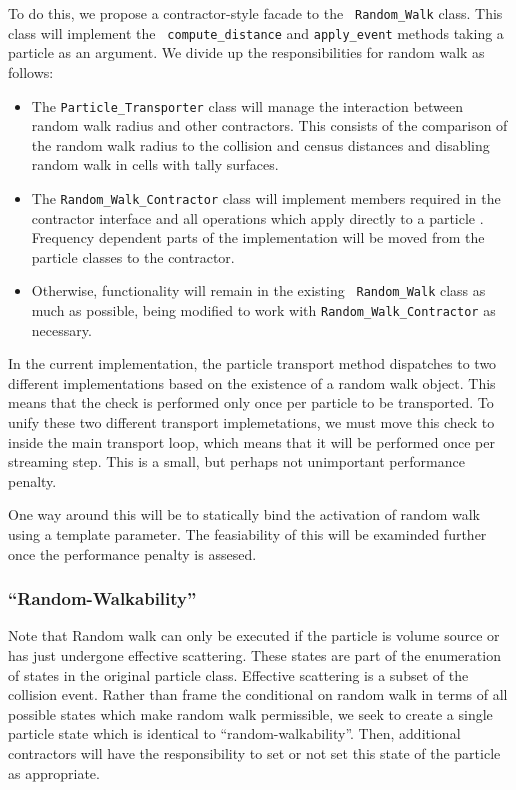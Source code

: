 \documentclass[memo]{ResearchNote}
\begin{document}
To do this, we propose a contractor-style facade to the {\tt
  Random\_Walk} class. This class will implement the {\tt
  compute\_distance} and {\tt apply\_event} methods taking a particle as
an argument. We divide up the responsibilities for random walk as
follows:

\begin{itemize}
\item The {\tt Particle\_Transporter} class will manage the
  interaction between random walk radius and other contractors. 
  This consists of the comparison of the random walk radius to the
  collision and census distances and disabling random walk in
  cells with tally surfaces. 
\item The {\tt Random\_Walk\_Contractor} class will implement members
  required in the contractor interface and all operations which apply
  directly to a particle . Frequency dependent parts of the
  implementation will be moved from the particle classes to the
  contractor.
\item Otherwise, functionality will remain in the existing {\tt
    Random\_Walk} class as much as possible, being modified to work
  with {\tt Random\_Walk\_Contractor} as necessary.
\end{itemize}

In the current implementation, the particle transport method
dispatches to two different implementations based on the existence of
a random walk object. This means that the check is performed only once
per particle to be transported. To unify these two different transport
implemetations, we must move this check to inside the main transport
loop, which means that it will be performed once per streaming step.
This is a small, but perhaps not unimportant performance penalty.

One way around this will be to statically bind the activation of
random walk using a template parameter. The feasiability of this will
be examinded further once the performance penalty is assesed.

\subsubsection{``Random-Walkability''}

Note that Random walk can only be executed if the particle is volume
source or has just undergone effective scattering. These states are
part of the enumeration of states in the original particle class.
Effective scattering is a subset of the collision event. Rather than
frame the conditional on random walk in terms of all possible states
which make random walk permissible, we seek to create a single
particle state which is identical to ``random-walkability''. Then,
additional contractors will have the responsibility to set or not set
this state of the particle as appropriate.
\end{document}
